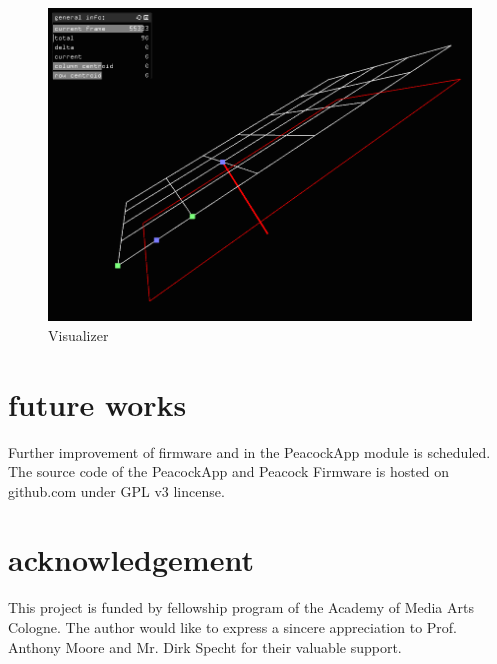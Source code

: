 \documentclass{nime-alternate}
\begin{document}
\begin{figure}[htbp]
       \begin{center}
              \includegraphics[scale=0.3]{visualizer.png}
       \end{center}
       \caption{Visualizer}
       \label{fig:visualizer}
\end{figure}


\section{future works}

Further improvement of firmware and in the PeacockApp module is scheduled.
The source code of the PeacockApp and Peacock Firmware is hosted on github.com under GPL v3 lincense.


\section{acknowledgement}
This project is funded by fellowship program of the Academy of Media Arts Cologne. The author would like to express a sincere appreciation to Prof. Anthony Moore and Mr. Dirk Specht for their valuable support.



\end{document}
